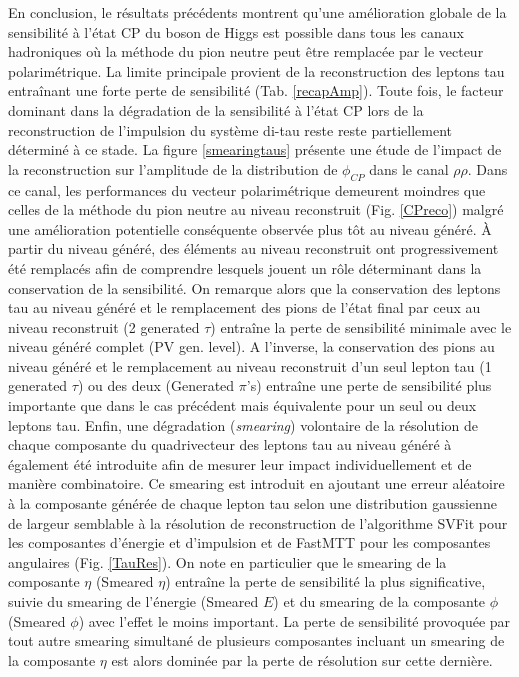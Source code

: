 En conclusion, le résultats précédents montrent qu'une amélioration globale de la sensibilité à l'état CP du boson de Higgs est possible dans tous les canaux hadroniques où la méthode du pion neutre peut être remplacée par le vecteur polarimétrique. La limite principale provient de la reconstruction des leptons tau entraînant une forte perte de sensibilité (Tab. \ref{recapAmp}). Toute fois, le facteur dominant dans la dégradation de la sensibilité à l'état CP lors de la reconstruction de l'impulsion du système di-tau reste reste partiellement déterminé à ce stade. La figure \ref{smearingtaus} présente une étude de l'impact de la reconstruction sur l'amplitude de la distribution de $\phi_{CP}$ dans le canal $\rho\rho$. Dans ce canal, les performances du vecteur polarimétrique demeurent moindres que celles de la méthode du pion neutre au niveau reconstruit (Fig. \ref{CPreco}) malgré une amélioration potentielle conséquente observée plus tôt au niveau généré. À partir du niveau généré, des éléments au niveau reconstruit ont progressivement été remplacés afin de comprendre lesquels jouent un rôle déterminant dans la conservation de la sensibilité. On remarque alors que la conservation des leptons tau au niveau généré et le remplacement des pions de l'état final par ceux au niveau reconstruit (2 generated $\tau$) entraîne la perte de sensibilité minimale avec le niveau généré complet (PV gen. level). A l'inverse, la conservation des pions au niveau généré et le remplacement au niveau reconstruit d'un seul lepton tau (1 generated $\tau$) ou des deux (Generated $\pi$'s) entraîne une perte de sensibilité plus importante que dans le cas précédent mais équivalente pour un seul ou deux leptons tau. Enfin, une dégradation (\textit{smearing}) volontaire de la résolution de chaque composante du quadrivecteur des leptons tau au niveau généré à également été introduite afin de mesurer leur impact individuellement et de manière combinatoire. Ce smearing est introduit en ajoutant une erreur aléatoire à la composante générée de chaque lepton tau selon une distribution gaussienne de largeur semblable à la résolution de reconstruction de l'algorithme SVFit pour les composantes d'énergie et d'impulsion et de FastMTT pour les composantes angulaires (Fig. \ref{TauRes}). On note en particulier que le smearing de la composante $\eta$ (Smeared $\eta$) entraîne la perte de sensibilité la plus significative, suivie du smearing de l'énergie (Smeared $E$) et du smearing de la composante $\phi$ (Smeared $\phi$) avec l'effet le moins important. La perte de sensibilité provoquée par tout autre smearing simultané de plusieurs composantes incluant un smearing de la composante $\eta$ est alors dominée par la perte de résolution sur cette dernière.

